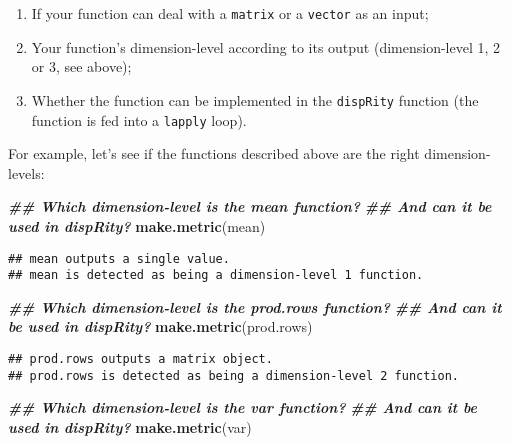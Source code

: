 \documentclass[
]{book}
\newenvironment{Shaded}{\begin{snugshade}}{\end{snugshade}}
\newcommand{\DocumentationTok}[1]{\textcolor[rgb]{0.56,0.35,0.01}{\textbf{\textit{#1}}}}
\newcommand{\FunctionTok}[1]{\textcolor[rgb]{0.13,0.29,0.53}{\textbf{#1}}}
\newcommand{\NormalTok}[1]{#1}
\providecommand{\tightlist}{%
  \setlength{\itemsep}{0pt}\setlength{\parskip}{0pt}}
\begin{document}
\begin{enumerate}
\def\labelenumi{\arabic{enumi}.}
\tightlist
\item
  If your function can deal with a \texttt{matrix} or a \texttt{vector} as an input;
\item
  Your function's dimension-level according to its output (dimension-level 1, 2 or 3, see above);
\item
  Whether the function can be implemented in the \texttt{dispRity} function (the function is fed into a \texttt{lapply} loop).
\end{enumerate}

For example, let's see if the functions described above are the right dimension-levels:

\begin{Shaded}
\begin{Highlighting}[]
\DocumentationTok{\#\# Which dimension{-}level is the mean function?}
\DocumentationTok{\#\# And can it be used in dispRity?}
\FunctionTok{make.metric}\NormalTok{(mean)}
\end{Highlighting}
\end{Shaded}

\begin{verbatim}
## mean outputs a single value.
## mean is detected as being a dimension-level 1 function.
\end{verbatim}

\begin{Shaded}
\begin{Highlighting}[]
\DocumentationTok{\#\# Which dimension{-}level is the prod.rows function?}
\DocumentationTok{\#\# And can it be used in dispRity?}
\FunctionTok{make.metric}\NormalTok{(prod.rows)}
\end{Highlighting}
\end{Shaded}

\begin{verbatim}
## prod.rows outputs a matrix object.
## prod.rows is detected as being a dimension-level 2 function.
\end{verbatim}

\begin{Shaded}
\begin{Highlighting}[]
\DocumentationTok{\#\# Which dimension{-}level is the var function?}
\DocumentationTok{\#\# And can it be used in dispRity?}
\FunctionTok{make.metric}\NormalTok{(var)}
\end{Highlighting}
\end{Shaded}
\end{document}

